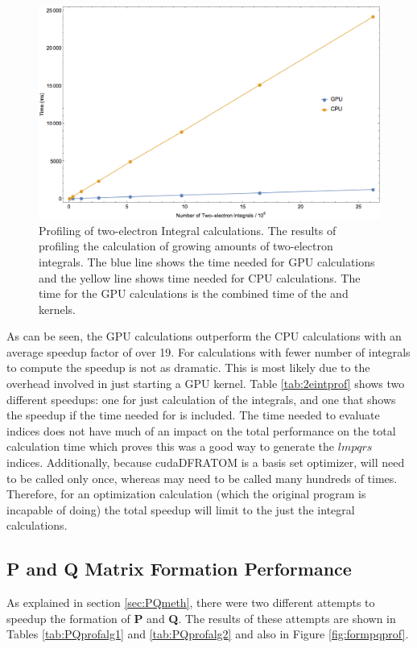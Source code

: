 \begin{figure}[h!]
\includegraphics[width=1\textwidth]{Figures/eint2prof.png}
\caption[Profiling of two-electron integral calculations]
{Profiling of two-electron Integral calculations. The results of profiling the calculation of growing amounts of two-electron integrals. The blue line shows the time needed for GPU calculations and the yellow line shows time needed for CPU calculations. The time for the GPU calculations is the combined time of the  and  kernels.}
\label{fig:2eintprof}
\end{figure}

As can be seen, the GPU calculations  outperform the CPU calculations with an average speedup factor of over 19. For calculations with fewer number of integrals to compute the speedup is not as dramatic. This is most likely due to the overhead involved in just starting a GPU kernel. Table \ref{tab:2eintprof} shows two different speedups: one for just calculation of the integrals, and one that shows the speedup if the time needed for  is included. The time needed to evaluate indices does not have much of an impact on the total performance on the total calculation time which proves this was a good way to generate the $lmpqrs$ indices. Additionally, because cudaDFRATOM is a basis set optimizer,  will need to be called only once, whereas  may need to be called many hundreds of times. Therefore, for an optimization calculation (which the original program is incapable of doing) the total speedup will limit to the just the integral calculations.

\subsection{P and Q Matrix Formation Performance}
As explained in section \ref{sec:PQmeth}, there were two different attempts to speedup the formation of \textbf{P} and \textbf{Q}. The results of these attempts are shown in Tables \ref{tab:PQprofalg1} and \ref{tab:PQprofalg2} and also in Figure \ref{fig:formpqprof}.

